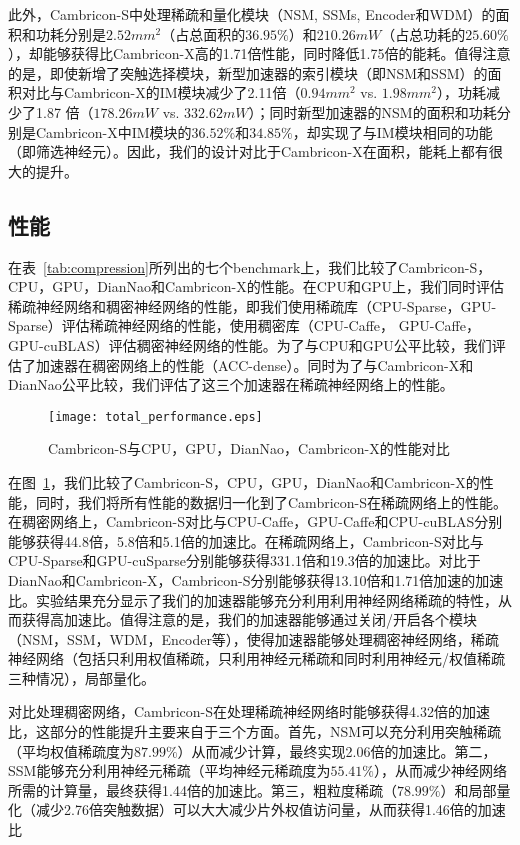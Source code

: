 此外，Cambricon-S中处理稀疏和量化模块（NSM, SSMs, Encoder和WDM）的面积和功耗分别是$2.52mm^2$（占总面积的$36.95\%$）和$210.26mW$（占总功耗的$25.60\%$），却能够获得比Cambricon-X高的1.71倍性能，同时降低1.75倍的能耗。值得注意的是，即使新增了突触选择模块，新型加速器的索引模块（即NSM和SSM）的面积对比与Cambricon-X的IM模块减少了2.11倍（$0.94mm^2$ vs. $1.98mm^2$），功耗减少了1.87 倍（$178.26mW$ vs. $332.62mW$）；同时新型加速器的NSM的面积和功耗分别是Cambricon-X中IM模块的$36.52\%$和$34.85\%$，却实现了与IM模块相同的功能（即筛选神经元）。因此，我们的设计对比于Cambricon-X在面积，能耗上都有很大的提升。

\subsection{性能}
在表~\ref{tab:compression}所列出的七个benchmark上，我们比较了Cambricon-S，CPU，GPU，DianNao和Cambricon-X的性能。在CPU和GPU上，我们同时评估稀疏神经网络和稠密神经网络的性能，即我们使用稀疏库（CPU-Sparse，GPU-Sparse）评估稀疏神经网络的性能，使用稠密库（CPU-Caffe， GPU-Caffe， GPU-cuBLAS）评估稠密神经网络的性能。为了与CPU和GPU公平比较，我们评估了加速器在稠密网络上的性能（ACC-dense）。同时为了与Cambricon-X和DianNao公平比较，我们评估了这三个加速器在稀疏神经网络上的性能。

\begin{figure}[h]
\centering
\texttt{[image: total\_performance.eps]}
\caption{Cambricon-S与CPU，GPU，DianNao，Cambricon-X的性能对比}
\label{fig:total_performance}
\end{figure}

在图~\ref{fig:total_performance}，我们比较了Cambricon-S，CPU，GPU，DianNao和Cambricon-X的性能，同时，我们将所有性能的数据归一化到了Cambricon-S在稀疏网络上的性能。在稠密网络上，Cambricon-S对比与CPU-Caffe，GPU-Caffe和CPU-cuBLAS分别能够获得44.8倍，5.8倍和5.1倍的加速比。在稀疏网络上，Cambricon-S对比与CPU-Sparse和GPU-cuSparse分别能够获得331.1倍和19.3倍的加速比。对比于DianNao和Cambricon-X，Cambricon-S分别能够获得13.10倍和1.71倍加速的加速比。实验结果充分显示了我们的加速器能够充分利用利用神经网络稀疏的特性，从而获得高加速比。值得注意的是，我们的加速器能够通过关闭/开启各个模块（NSM，SSM，WDM，Encoder等），使得加速器能够处理稠密神经网络，稀疏神经网络（包括只利用权值稀疏，只利用神经元稀疏和同时利用神经元/权值稀疏三种情况），局部量化。

对比处理稠密网络，Cambricon-S在处理稀疏神经网络时能够获得4.32倍的加速比，这部分的性能提升主要来自于三个方面。首先，NSM可以充分利用突触稀疏（平均权值稀疏度为$87.99\%$）从而减少计算，最终实现2.06倍的加速比。第二，SSM能够充分利用神经元稀疏（平均神经元稀疏度为$55.41\%$），从而减少神经网络所需的计算量，最终获得1.44倍的加速比。第三，粗粒度稀疏（$78.99\%$）和局部量化（减少2.76倍突触数据）可以大大减少片外权值访问量，从而获得1.46倍的加速比

